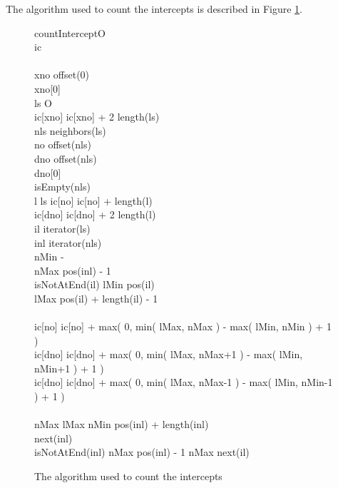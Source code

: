 \documentclass{InsightArticle}
\begin{document}
The algorithm used to count the intercepts is described in Figure \ref{interceptCountAlgo}.

\begin{figure}[htbp]
\centering
\small
\begin{pseudocode}[framebox]{countIntercept}{O}
 \\
ic \GETS \emptyset \\
 \\
xno \GETS offset(0) \\
xno[0]  \\
\FOREACH ls \in O \DO
\BEGIN
   \\
  ic[xno] \GETS ic[xno] + 2 \cdot length(ls) \\
  \FOREACH nls \in neighbors(ls) \DO
  \BEGIN
     \\
    no \GETS offset(nls) \\
    dno \GETS offset(nls) \\
    dno[0]  \\
    \IF isEmpty(nls) \THEN
    \BEGIN
       \\
      \FOREACH l \in ls \DO
      \BEGIN
	ic[no] \GETS ic[no] + length(l)\\
	ic[dno] \GETS ic[dno] + 2 \cdot length(l)
      \END
    \END
    \ELSE
    \BEGIN
       \\
      il \GETS iterator(ls) \\
      inl \GETS iterator(nls) \\
      nMin \GETS -\infty \\
      nMax \GETS pos(inl) - 1 \\
      \WHILE isNotAtEnd(il) \DO
      \BEGIN
        lMin \GETS pos(il) \\
        lMax \GETS pos(il) + length(il) - 1 \\
         \\
	ic[no] \GETS ic[no] + max( 0, min( lMax, nMax ) - max( lMin, nMin ) + 1 ) \\
	ic[dno] \GETS ic[dno] + max( 0, min( lMax, nMax+1 ) - max( lMin, nMin+1 ) + 1 )\\
	ic[dno] \GETS ic[dno] + max( 0, min( lMax, nMax-1 ) - max( lMin, nMin-1 ) + 1 )\\
         \\
	\IF nMax \leq lMax \THEN
	\BEGIN
          nMin \GETS pos(inl) + length(inl) \\
          next(inl) \\
          \IF isNotAtEnd(inl) \DO
            nMax \GETS pos(inl) - 1
          \ELSE
            nMax \GETS \infty
	\END
	\ELSE
          next(il)
      \END
    \END
  \END
\END
\end{pseudocode}
\caption{\label{interceptCountAlgo}The algorithm used to count the intercepts}
\end{figure}
\end{document}
